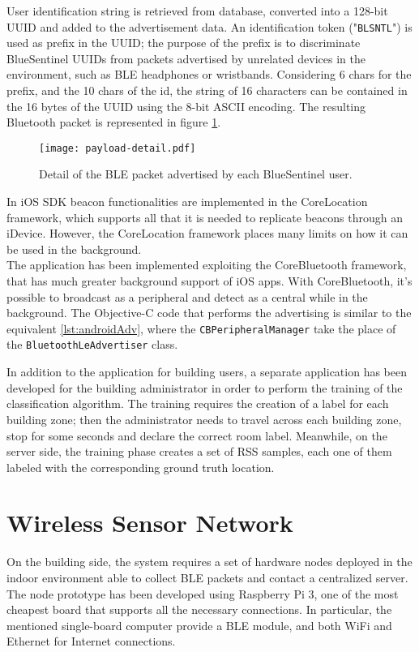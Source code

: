 User identification string is retrieved from database, converted into a 128-bit UUID and added to the advertisement data. An identification token ("\verb|BLSNTL|") is used as prefix in the UUID; the purpose of the prefix is to discriminate BlueSentinel UUIDs from packets advertised by unrelated devices in the environment, such as BLE headphones or wristbands. Considering 6 chars for the prefix, and the 10 chars of the id, the string of 16 characters can be contained in the 16 bytes of the UUID using the 8-bit ASCII encoding. The resulting Bluetooth packet is represented in figure \ref{fig:payload-detail}.

\begin{figure}[h!tb]
\centering
\texttt{[image: payload-detail.pdf]}
\caption[Detail of the BLE packet advertised by each BlueSentinel user.]{Detail of the BLE packet advertised by each BlueSentinel user.}
\label{fig:payload-detail}
\end{figure}

\medskip
In iOS SDK beacon functionalities are implemented in the CoreLocation framework, which supports all that it is needed to replicate beacons through an iDevice.
However, the CoreLocation framework places many limits on how it can be used in the background.\\
The application has been implemented exploiting the CoreBluetooth framework, that has much greater background support of iOS apps. With CoreBluetooth, it's possible to broadcast as a peripheral and detect as a central while in the background. The Objective-C code that performs the advertising is similar to the equivalent \ref{lst:androidAdv}, where the \verb|CBPeripheralManager| take the place of the \verb|BluetoothLeAdvertiser| class.


\medskip
In addition to the application for building users, a separate application has been developed for the building administrator in order to perform the training of the classification algorithm. The training requires the creation of a label for each building zone; then the administrator needs to travel across each building zone, stop for some seconds and declare the correct room label. Meanwhile, on the server side, the training phase creates a set of RSS samples, each one of them labeled with the corresponding ground truth location.

\section{Wireless Sensor Network}
\label{sec:network}
On the building side, the system requires a set of hardware nodes deployed in the indoor environment able to collect BLE packets and contact a centralized server. The node prototype has been developed using Raspberry Pi 3, one of the most cheapest board that supports all the necessary connections. In particular, the mentioned single-board computer provide a BLE module, and both WiFi and Ethernet for Internet connections.


